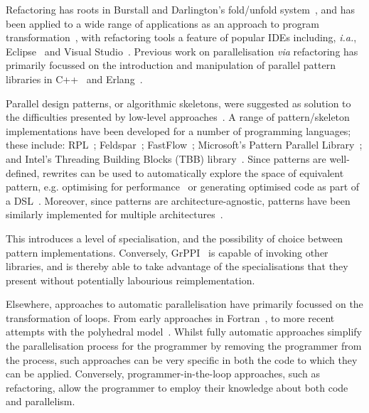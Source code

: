 Refactoring has roots in Burstall and Darlington's fold/unfold system~\cite{darlington77}, and has been applied to a wide range of applications as an approach to program transformation~\cite{mens_refactoring}, with refactoring tools a feature of popular IDEs including, \textit{i.a.}, Eclipse~\cite{EclipseWeb} and Visual Studio~\cite{VisualStudioWeb}.
Previous work on parallelisation \textit{via} refactoring has primarily focussed on the introduction and manipulation of parallel pattern libraries in C++~\cite{brownagricultural,DBLP:conf/pdp/JanjicBMHDAG16} and Erlang~\cite{hlpp,DBLP:journals/cai/BarwellBHTB16}.

Parallel design patterns, or algorithmic skeletons, were suggested as solution to the difficulties presented by low-level approaches~\cite{Asanovic:2009:VPC,DBLP:journals/spe/Gonzalez-VelezL10}.
A range of pattern/skeleton implementations have been developed for a number of programming languages; these include: RPL~\cite{DBLP:conf/pdp/JanjicBMHDAG16}; Feldspar~\cite{DBLP:conf/ifl/AxelssonCSSEP10}; FastFlow~\cite{DBLP:journals/mis/JinLWY15}; Microsoft's Pattern Parallel Library~\cite{ACM:book/msoft/CampbellM11}; and Intel's Threading Building Blocks (TBB) library~\cite{DBLP:reference/parallel/X11pz}.
Since patterns are well-defined, rewrites can be used to automatically explore the space of equivalent pattern, e.g. optimising for performance~\cite{DBLP:conf/europar/MatsuzakiKIHA04,DBLP:conf/ipps/GorlatchWL99} or generating optimised code as part of a DSL~\cite{DBLP:conf/dagstuhl/Gorlatch03}. Moreover, since patterns are architecture-agnostic, patterns have been similarly implemented for multiple architectures~\cite{DBLP:conf/cgo/HagedornSSGD18,DBLP:conf/parco/ReyesL15}.

This introduces a level of specialisation, and the possibility of choice between pattern implementations. Conversely, GrPPI~\cite{DBLP:journals/concurrency/AstorgaD0G17} is capable of invoking other libraries, and is thereby able to take advantage of the specialisations that they present without potentially labourious reimplementation.


Elsewhere, approaches to automatic parallelisation have primarily focussed on the transformation of loops. From early approaches in Fortran~\cite{DBLP:journals/cacm/Lamport74}, to more recent attempts with the polyhedral model~\cite{DBLP:conf/ppopp/AncourtI91}. Whilst fully automatic approaches simplify the parallelisation process for the programmer by removing the programmer from the process, such approaches can be very specific in both the code to which they can be applied. Conversely, programmer-in-the-loop approaches, such as refactoring, allow the programmer to employ their knowledge about both code and parallelism.

